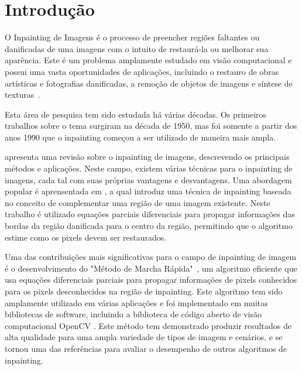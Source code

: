 
\section{Introdução} \label{introduction}
O Inpainting de Imagens é o processo de preencher regiões faltantes ou danificadas de uma imagens com o intuito de restaurá-la ou melhorar sua aparência. Este é um problema amplamente estudado em visão computacional e possui uma vasta oportunidades de aplicações, incluindo o restauro de obras artísticas e fotografias danificadas, a remoção de objetos de imagens e síntese de texturas~\cite{criminisi2004region}.

Esta área de pesquisa tem sido estudada há várias décadas. Os primeiros trabalhos sobre o tema surgiram na década de 1950, mas foi somente a partir dos anos 1990 que o inpainting começou a ser utilizado de maneira mais ampla.

\cite{Elharrouss2019} apresenta uma revisão sobre o inpainting de imagens, descrevendo os principais métodos e aplicações. Neste campo, existem várias técnicas para o inpainting de imagens, cada tal com suas próprias vantagens e desvantagens. Uma abordagem popular é aprensentada em \cite{Bertalmio2000}, a qual introduz uma técnica de inpainting baseada no conceito de complementar uma região de uma imagem existente. Neste trabalho é utilizado equações parciais diferenciais para propagar informações das bordas da região danificada para o centro da região, permitindo que o algoritmo estime como os pixels devem ser restaurados.

Uma das contribuições mais significativas para o campo de inpainting de imagem é o desenvolvimento do "Método de Marcha Rápida"~\cite{Telea2004}, um algoritmo eficiente que usa equações diferenciais parciais para propagar informações de pixels conhecidos para os pixels desconhecidos na região de inpainting. Este algoritmo tem sido amplamente utilizado em várias aplicações e foi implementado em muitas bibliotecas de software, incluindo a biblioteca de código aberto de visão computacional OpenCV \cite{OpenCV}. Este método tem demonstrado produzir resultados de alta qualidade para uma ampla variedade de tipos de imagem e cenários, e se tornou uma das referências para avaliar o desempenho de outros algoritmos de inpainting.

